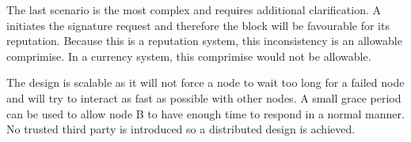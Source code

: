 The last scenario is the most complex and requires additional clarification.
A initiates the signature request and therefore the block will be favourable for its reputation.
Because this is a reputation system, this inconsistency is an allowable comprimise.
In a currency system, this comprimise would not be allowable.

The design is scalable as it will not force a node to wait too long for a failed node
and will try to interact as fast as possible with other nodes.
A small grace period can be used to allow node B to have enough time to respond in a normal manner.
No trusted third party is introduced so a distributed design is achieved.